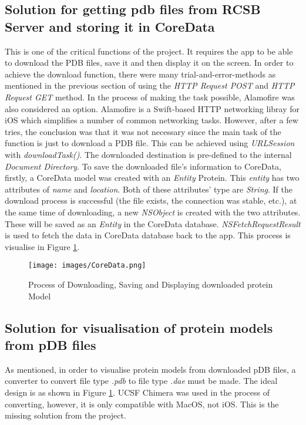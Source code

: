 \begin{itemize}
\end{itemize}

\subsection{Solution for getting pdb files from RCSB Server and storing it in CoreData}
This is one of the critical functions of the project. It requires the app to be able to download the PDB files, save it and then display it on the screen. 
In order to achieve the download function, there were many trial-and-error-methods as mentioned in the previous section of using the \emph{HTTP Request POST} and \emph{HTTP Request GET} method. In the process of making the task possible, Alamofire was also considered an option. Alamofire is a Swift-based HTTP networking libray for iOS which simplifies a number of common networking tasks. However, after a few tries, the conclusion was that it was not necessary since the main task of the function is just to download a PDB file. This can be achieved using \emph{URLSession} with \emph{downloadTask()}. The downloaded destination is pre-defined to the internal \emph{Document Directory}. 
To save the downloaded file’s information to CoreData, firstly, a CoreData model was created with an \emph{Entity} Protein. This \emph{entity} has two attributes of \emph{name} and \emph{location}. Both of these attributes’ type are \emph{String}. If the download process is successful (the file exists, the connection was stable, etc.), at the same time of downloading, a new \emph{NSObject} is created with the two attributes. These will be saved as an \emph{Entity} in the CoreData database. 
\emph{NSFetchRequestResult} is used to fetch the data in CoreData database back to the app. This process is visualise in Figure \ref{fig:coredata}.

\begin{figure}[!htp]
	\centering
	\texttt{[image: images/CoreData.png]}
	\caption{Process of Downloading, Saving and Displaying downloaded protein Model}
	\label{fig:coredata}
\end{figure}


\subsection{Solution for visualisation of protein models from pDB files}
As mentioned, in order to visualise protein models from downloaded pDB files, a converter to convert file type \emph{.pdb} to file type \emph{.dae} must be made. The ideal design is as shown in Figure \ref{fig:coredata}. UCSF Chimera was used in the process of converting, however, it is only compatible with MacOS, not iOS. This is the missing solution from the project. 

